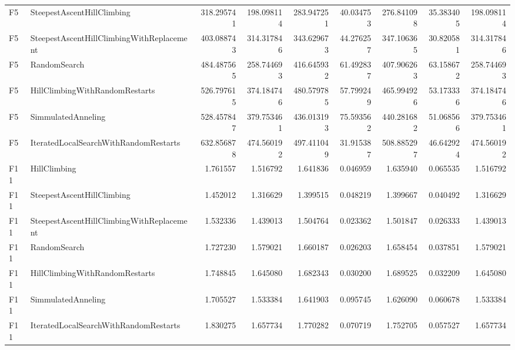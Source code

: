 \begin{tabular}{llrrrrrrr}
F5 & SteepestAscentHillClimbing & 318.295741 & 198.098114 & 283.947251 & 40.034753 & 276.841098 & 35.383405 & 198.098114 \\
F5 & SteepestAscentHillClimbingWithReplacement & 403.088743 & 314.317846 & 343.629673 & 44.276257 & 347.106365 & 30.820581 & 314.317846 \\
F5 & RandomSearch & 484.487565 & 258.744693 & 416.645932 & 61.492837 & 407.906263 & 63.158672 & 258.744693 \\
F5 & HillClimbingWithRandomRestarts & 526.797615 & 374.184746 & 480.579785 & 57.799249 & 465.994926 & 53.173336 & 374.184746 \\
F5 & SimmulatedAnneling & 528.457847 & 379.753461 & 436.013193 & 75.593562 & 440.281682 & 51.068566 & 379.753461 \\
F5 & IteratedLocalSearchWithRandomRestarts & 632.856878 & 474.560192 & 497.411049 & 31.915387 & 508.885297 & 46.642924 & 474.560192 \\
F11 & HillClimbing & 1.761557 & 1.516792 & 1.641836 & 0.046959 & 1.635940 & 0.065535 & 1.516792 \\
F11 & SteepestAscentHillClimbing & 1.452012 & 1.316629 & 1.399515 & 0.048219 & 1.399667 & 0.040492 & 1.316629 \\
F11 & SteepestAscentHillClimbingWithReplacement & 1.532336 & 1.439013 & 1.504764 & 0.023362 & 1.501847 & 0.026333 & 1.439013 \\
F11 & RandomSearch & 1.727230 & 1.579021 & 1.660187 & 0.026203 & 1.658454 & 0.037851 & 1.579021 \\
F11 & HillClimbingWithRandomRestarts & 1.748845 & 1.645080 & 1.682343 & 0.030200 & 1.689525 & 0.032209 & 1.645080 \\
F11 & SimmulatedAnneling & 1.705527 & 1.533384 & 1.641903 & 0.095745 & 1.626090 & 0.060678 & 1.533384 \\
F11 & IteratedLocalSearchWithRandomRestarts & 1.830275 & 1.657734 & 1.770282 & 0.070719 & 1.752705 & 0.057527 & 1.657734 \\
\bottomrule
\end{tabular}
